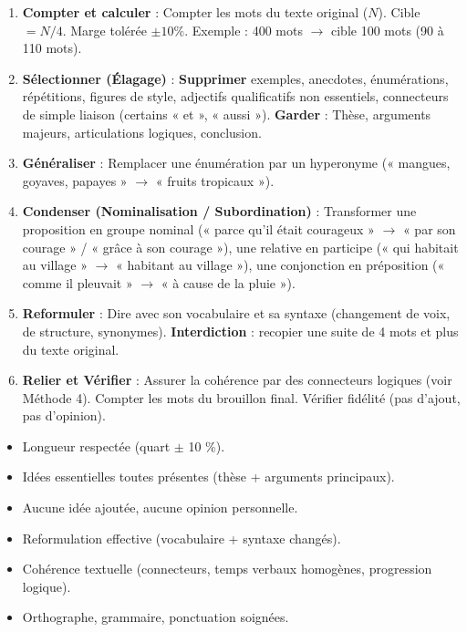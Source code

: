 \documentclass[11pt]{article}
\begin{document}
\begin{methode}
\begin{enumerate}
\item \textbf{Compter et calculer} : Compter les mots du texte original ($N$). Cible $= N / 4$. Marge tolérée $\pm 10 \%$. Exemple : 400 mots $\rightarrow$ cible 100 mots (90 à 110 mots).
\item \textbf{Sélectionner (Élagage)} : \textbf{Supprimer} exemples, anecdotes, énumérations, répétitions, figures de style, adjectifs qualificatifs non essentiels, connecteurs de simple liaison (certains « et », « aussi »). \textbf{Garder} : Thèse, arguments majeurs, articulations logiques, conclusion.
\item \textbf{Généraliser} : Remplacer une énumération par un hyperonyme (« mangues, goyaves, papayes » $\rightarrow$ « fruits tropicaux »).
\item \textbf{Condenser (Nominalisation / Subordination)} : Transformer une proposition en groupe nominal (« parce qu'il était courageux » $\rightarrow$ « par son courage » / « grâce à son courage »), une relative en participe (« qui habitait au village » $\rightarrow$ « habitant au village »), une conjonction en préposition (« comme il pleuvait » $\rightarrow$ « à cause de la pluie »).
\item \textbf{Reformuler} : Dire avec son vocabulaire et sa syntaxe (changement de voix, de structure, synonymes). \textbf{Interdiction} : recopier une suite de 4 mots et plus du texte original.
\item \textbf{Relier et Vérifier} : Assurer la cohérence par des connecteurs logiques (voir Méthode 4). Compter les mots du brouillon final. Vérifier fidélité (pas d'ajout, pas d'opinion).
\end{enumerate}
\end{methode}

\begin{aretenir}
\begin{itemize}
\item[$\square$] Longueur respectée (quart $\pm$ 10 \%).
\item[$\square$] Idées essentielles toutes présentes (thèse + arguments principaux).
\item[$\square$] Aucune idée ajoutée, aucune opinion personnelle.
\item[$\square$] Reformulation effective (vocabulaire + syntaxe changés).
\item[$\square$] Cohérence textuelle (connecteurs, temps verbaux homogènes, progression logique).
\item[$\square$] Orthographe, grammaire, ponctuation soignées.
\end{itemize}
\end{aretenir}
\end{document}
